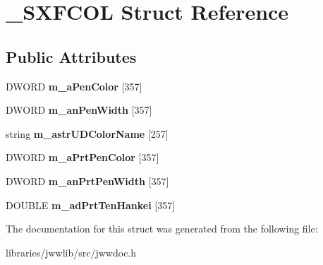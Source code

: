 \hypertarget{struct__SXFCOL}{\section{\-\_\-\-S\-X\-F\-C\-O\-L Struct Reference}
\label{struct__SXFCOL}
}
\subsection*{Public Attributes}
\begin{DoxyCompactItemize}
\item 
\hypertarget{struct__SXFCOL_acce233c8d6314d99c0b4c8a7467137a3}{D\-W\-O\-R\-D {\bfseries m\-\_\-a\-Pen\-Color} \mbox{[}357\mbox{]}}\label{struct__SXFCOL_acce233c8d6314d99c0b4c8a7467137a3}

\item 
\hypertarget{struct__SXFCOL_ad41822a06edd0340a961ea1bdf835819}{D\-W\-O\-R\-D {\bfseries m\-\_\-an\-Pen\-Width} \mbox{[}357\mbox{]}}\label{struct__SXFCOL_ad41822a06edd0340a961ea1bdf835819}

\item 
\hypertarget{struct__SXFCOL_a1250467b015782159968e3b7eadb0d99}{string {\bfseries m\-\_\-astr\-U\-D\-Color\-Name} \mbox{[}257\mbox{]}}\label{struct__SXFCOL_a1250467b015782159968e3b7eadb0d99}

\item 
\hypertarget{struct__SXFCOL_a53d5004f8e56e1b980002f0c73620e4a}{D\-W\-O\-R\-D {\bfseries m\-\_\-a\-Prt\-Pen\-Color} \mbox{[}357\mbox{]}}\label{struct__SXFCOL_a53d5004f8e56e1b980002f0c73620e4a}

\item 
\hypertarget{struct__SXFCOL_aa5f588b2f13180341d06ef6cda09485d}{D\-W\-O\-R\-D {\bfseries m\-\_\-an\-Prt\-Pen\-Width} \mbox{[}357\mbox{]}}\label{struct__SXFCOL_aa5f588b2f13180341d06ef6cda09485d}

\item 
\hypertarget{struct__SXFCOL_a1ad76f17b5cb143a674c5b0807cfd681}{D\-O\-U\-B\-L\-E {\bfseries m\-\_\-ad\-Prt\-Ten\-Hankei} \mbox{[}357\mbox{]}}\label{struct__SXFCOL_a1ad76f17b5cb143a674c5b0807cfd681}

\end{DoxyCompactItemize}


The documentation for this struct was generated from the following file\-:\begin{DoxyCompactItemize}
\item 
libraries/jwwlib/src/jwwdoc.\-h\end{DoxyCompactItemize}
